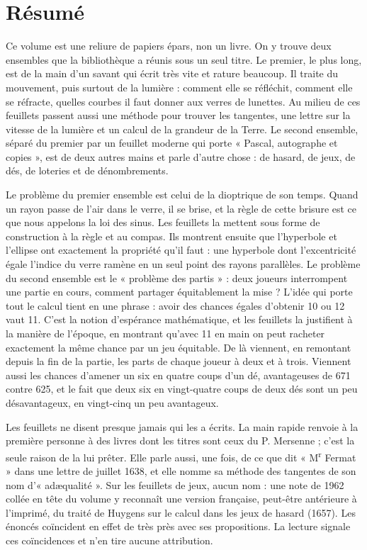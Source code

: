 \documentclass[11pt,a4paper]{article}
\begin{document}
\section*{Résumé}

\begin{resume}
Ce volume est une reliure de papiers épars, non un livre. On y trouve deux
ensembles que la bibliothèque a réunis sous un seul titre. Le premier, le plus
long, est de la main d'un savant qui écrit très vite et rature beaucoup. Il
traite du mouvement, puis surtout de la lumière : comment elle se réfléchit,
comment elle se réfracte, quelles courbes il faut donner aux verres de lunettes.
Au milieu de ces feuillets passent aussi une méthode pour trouver les tangentes,
une lettre sur la vitesse de la lumière et un calcul de la grandeur de la Terre.
Le second ensemble, séparé du premier par un feuillet moderne qui porte
« Pascal, autographe et copies », est de deux autres mains et parle d'autre
chose : de hasard, de jeux, de dés, de loteries et de dénombrements.

Le problème du premier ensemble est celui de la dioptrique de son temps.
Quand un rayon passe de l'air dans le verre, il se brise, et la règle de cette
brisure est ce que nous appelons la loi des sinus. Les feuillets la mettent
sous forme de construction à la règle et au compas. Ils montrent ensuite que
l'hyperbole et l'ellipse ont exactement la propriété qu'il faut : une hyperbole
dont l'excentricité égale l'indice du verre ramène en un seul point des rayons
parallèles. Le problème du second ensemble est le « problème des partis » :
deux joueurs interrompent une partie en cours, comment partager
équitablement la mise ? L'idée qui porte tout le calcul tient en une phrase :
avoir des chances égales d'obtenir 10 ou 12 vaut 11. C'est la notion
d'espérance mathématique, et les feuillets la justifient à la manière de
l'époque, en montrant qu'avec 11 en main on peut racheter exactement la même
chance par un jeu équitable. De là viennent, en remontant depuis la fin de la
partie, les parts de chaque joueur à deux et à trois. Viennent aussi les chances
d'amener un six en quatre coups d'un dé, avantageuses de 671 contre 625, et le
fait que deux six en vingt-quatre coups de deux dés sont un peu désavantageux,
en vingt-cinq un peu avantageux.

Les feuillets ne disent presque jamais qui les a écrits. La main rapide renvoie
à la première personne à des livres dont les titres sont ceux du P. Mersenne ;
c'est la seule raison de la lui prêter. Elle parle aussi, une fois, de ce que
dit « M\textsuperscript{r} Fermat » dans une lettre de juillet 1638, et
elle nomme sa méthode des tangentes de son nom d'« adæqualité ». Sur les
feuillets de jeux, aucun nom : une note de 1962 collée en tête du volume y
reconnaît une version française, peut-être antérieure à l'imprimé, du traité
de Huygens sur le calcul dans les jeux de hasard (1657). Les énoncés
coïncident en effet de très près avec ses propositions. La lecture signale ces
coïncidences et n'en tire aucune attribution.


\end{resume}
\end{document}
